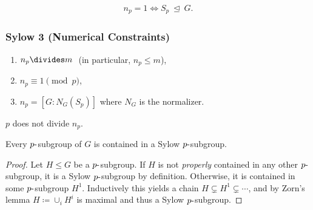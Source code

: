 \begin{corollary}

\begin{align*}
n_p = 1 \iff S_p {~\trianglelefteq~}G
.\end{align*}

\end{corollary}

\hypertarget{sylow-3-numerical-constraints}{%
\subsubsection{Sylow 3 (Numerical
Constraints)}\label{sylow-3-numerical-constraints}}

\begin{theorem}[Sylow 3]

\envlist

\begin{enumerate}
\def\labelenumi{\arabic{enumi}.}
\item
  \(n_p \divides m~\) (in particular, \(n_p \leq m\)),
\item
  \(n_p \equiv 1 \pmod p\),
\item
  \(n_p = [G : N_G(S_p)]\) where \(N_G\) is the normalizer.
\end{enumerate}

\end{theorem}

\begin{corollary}

\(p\) does not divide \(n_p\).

\end{corollary}

\begin{proposition}

Every \(p{\hbox{-}}\)subgroup of \(G\) is contained in a Sylow
\(p{\hbox{-}}\)subgroup.

\end{proposition}

\begin{proof}

Let \(H \leq G\) be a \(p{\hbox{-}}\)subgroup. If \(H\) is not
\emph{properly} contained in any other \(p{\hbox{-}}\)subgroup, it is a
Sylow \(p{\hbox{-}}\)subgroup by definition. Otherwise, it is contained
in some \(p{\hbox{-}}\)subgroup \(H^1\). Inductively this yields a chain
\(H \subsetneq H^1 \subsetneq \cdots\), and by Zorn's lemma
\(H\coloneqq\cup_i H^i\) is maximal and thus a Sylow
\(p{\hbox{-}}\)subgroup.

\end{proof}


